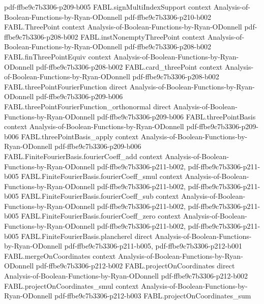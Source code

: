 \begin{theorem}
  {pdf-ffbe9c7b3306-p209-b005}
\proofstep
  {FABL.signMultiIndexSupport}
  {context}
  {Analysis-of-Boolean-Functions-by-Ryan-ODonnell}
  {pdf-ffbe9c7b3306-p210-b002}
\proofstep
  {FABL.ThreePoint}
  {context}
  {Analysis-of-Boolean-Functions-by-Ryan-ODonnell}
  {pdf-ffbe9c7b3306-p208-b002}
\proofstep
  {FABL.instNonemptyThreePoint}
  {context}
  {Analysis-of-Boolean-Functions-by-Ryan-ODonnell}
  {pdf-ffbe9c7b3306-p208-b002}
\proofstep
  {FABL.finThreePointEquiv}
  {context}
  {Analysis-of-Boolean-Functions-by-Ryan-ODonnell}
  {pdf-ffbe9c7b3306-p208-b002}
\proofstep
  {FABL.card_threePoint}
  {context}
  {Analysis-of-Boolean-Functions-by-Ryan-ODonnell}
  {pdf-ffbe9c7b3306-p208-b002}
\proofstep
  {FABL.threePointFourierFunction}
  {direct}
  {Analysis-of-Boolean-Functions-by-Ryan-ODonnell}
  {pdf-ffbe9c7b3306-p209-b006}
\proofstep
  {FABL.threePointFourierFunction_orthonormal}
  {direct}
  {Analysis-of-Boolean-Functions-by-Ryan-ODonnell}
  {pdf-ffbe9c7b3306-p209-b006}
\proofstep
  {FABL.threePointBasis}
  {context}
  {Analysis-of-Boolean-Functions-by-Ryan-ODonnell}
  {pdf-ffbe9c7b3306-p209-b006}
\proofstep
  {FABL.threePointBasis_apply}
  {context}
  {Analysis-of-Boolean-Functions-by-Ryan-ODonnell}
  {pdf-ffbe9c7b3306-p209-b006}
\proofstep
  {FABL.FiniteFourierBasis.fourierCoeff_add}
  {context}
  {Analysis-of-Boolean-Functions-by-Ryan-ODonnell}
  {pdf-ffbe9c7b3306-p211-b002,
    pdf-ffbe9c7b3306-p211-b005}
\proofstep
  {FABL.FiniteFourierBasis.fourierCoeff_smul}
  {context}
  {Analysis-of-Boolean-Functions-by-Ryan-ODonnell}
  {pdf-ffbe9c7b3306-p211-b002,
    pdf-ffbe9c7b3306-p211-b005}
\proofstep
  {FABL.FiniteFourierBasis.fourierCoeff_sub}
  {context}
  {Analysis-of-Boolean-Functions-by-Ryan-ODonnell}
  {pdf-ffbe9c7b3306-p211-b002,
    pdf-ffbe9c7b3306-p211-b005}
\proofstep
  {FABL.FiniteFourierBasis.fourierCoeff_zero}
  {context}
  {Analysis-of-Boolean-Functions-by-Ryan-ODonnell}
  {pdf-ffbe9c7b3306-p211-b002,
    pdf-ffbe9c7b3306-p211-b005}
\proofstep
  {FABL.FiniteFourierBasis.plancherel}
  {direct}
  {Analysis-of-Boolean-Functions-by-Ryan-ODonnell}
  {pdf-ffbe9c7b3306-p211-b005,
    pdf-ffbe9c7b3306-p212-b001}
\proofstep
  {FABL.mergeOnCoordinates}
  {context}
  {Analysis-of-Boolean-Functions-by-Ryan-ODonnell}
  {pdf-ffbe9c7b3306-p212-b002}
\proofstep
  {FABL.projectOnCoordinates}
  {direct}
  {Analysis-of-Boolean-Functions-by-Ryan-ODonnell}
  {pdf-ffbe9c7b3306-p212-b002}
\proofstep
  {FABL.projectOnCoordinates_smul}
  {context}
  {Analysis-of-Boolean-Functions-by-Ryan-ODonnell}
  {pdf-ffbe9c7b3306-p212-b003}
\proofstep
  {FABL.projectOnCoordinates_sum}

\end{theorem}
